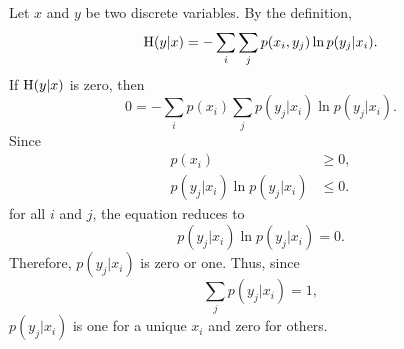 \subsection{}
\label{1.33}
Let $x$ and $y$ be two discrete variables.
By the definition,
%
\begin{equation}
{\rm H} (y | x) 
= 
- 
\sum_{i} 
\sum_{j} 
p(x_i, y_j) 
\ln p(y_j | x_i).
\end{equation}
%
If ${\rm H}(y | x)$ is zero, then
%
\begin{equation}
0 
= 
- 
\sum_{i} 
p(x_i)
\sum_{j} 
p(y_j | x_i) 
\ln p(y_j | x_i).
\end{equation}
%
Since
%
\begin{equation}
\begin{aligned}
p(x_i) 
&\geq 
0, 
\\
p(y_j | x_i) 
\ln p(y_j | x_i) 
&\leq 
0.
\end{aligned}
\end{equation}
%
for all $i$ and $j$, the equation reduces to
%
\begin{equation}
p(y_j | x_i) 
\ln p(y_j | x_i) 
= 
0.
\end{equation}
%
Therefore, $p(y_j | x_i)$ is zero or one.
Thus, since
%
\begin{equation}
\sum_j p(y_j | x_i) 
= 
1,
\end{equation}
%
$p(y_j | x_i)$ is one for a unique $x_i$ and zero for others.


